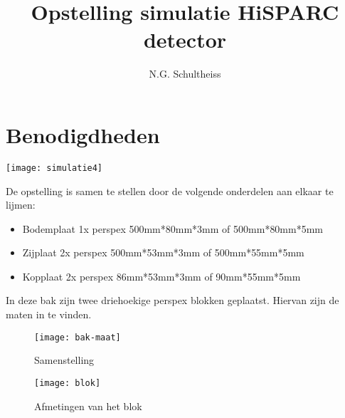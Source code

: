 



\title{Opstelling simulatie HiSPARC detector}
\author{N.G. Schultheiss}
\date{}

\maketitle
\thispagestyle{firststyle}

\section{Benodigdheden}

\noindent \begin{center}
\texttt{[image: simulatie4]}
\par\end{center}

De opstelling is samen te stellen door de volgende onderdelen aan
elkaar te lijmen:
\begin{itemize}
\item Bodemplaat 1x perspex 500mm{*}80mm{*}3mm of 500mm{*}80mm{*}5mm
\item Zijplaat 2x perspex 500mm{*}53mm{*}3mm of 500mm{*}55mm{*}5mm
\item Kopplaat 2x perspex 86mm{*}53mm{*}3mm of 90mm{*}55mm{*}5mm
\end{itemize}
In deze bak zijn twee driehoekige perspex blokken geplaatst. Hiervan
zijn de maten in  te vinden.


\begin{figure}
\begin{centering} \label{fig:bak-maat}
\texttt{[image: bak-maat]}
\par\end{centering}

\caption{Samenstelling}
\end{figure}


\begin{figure}
\noindent \begin{centering} \label{fig:blok}
\texttt{[image: blok]}
\par\end{centering}

\caption{Afmetingen van het blok}

\end{figure}


